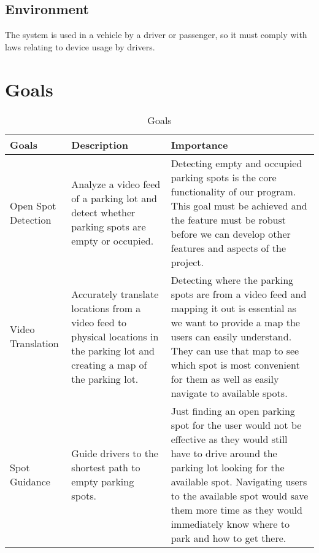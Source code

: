 \documentclass[12pt,letterpaper]{article}
\begin{document}
\subsection{Environment}
The system is used in a vehicle by a driver or passenger, so it must comply with
laws relating to device usage by drivers.

\newpage

\section{Goals}

\begin{table}[hp]
\begin{tabularx}{\textwidth}{|X|X|X|}
\toprule
\textbf{Goals} & \textbf{Description} & \textbf{Importance}\\
\midrule
Open Spot Detection & Analyze a video feed of a parking lot and detect whether
parking spots are empty or occupied. & Detecting empty and occupied parking
spots is the core functionality of our program. This goal must be achieved and
the feature must be robust before we can develop other features and aspects of
the project.\\
\hline
Video Translation & Accurately translate locations from a video feed to physical
locations in the parking lot and creating a map of the parking lot. & Detecting
where the parking spots are from a video feed and mapping it out is essential as
we want to provide a map the users can easily understand. They can use that map
to see which spot is most convenient for them as well as easily navigate to
available spots.\\
\hline
Spot Guidance & Guide drivers to the shortest path to empty parking spots. &
Just finding an open parking spot for the user would not be effective as they
would still have to drive around the parking lot looking for the available spot.
Navigating users to the available spot would save them more time as they would
immediately know where to park and how to get there.\\
\bottomrule
\end{tabularx}
\caption{Goals} \label{TblGoals} 
\end{table}
\end{document}
